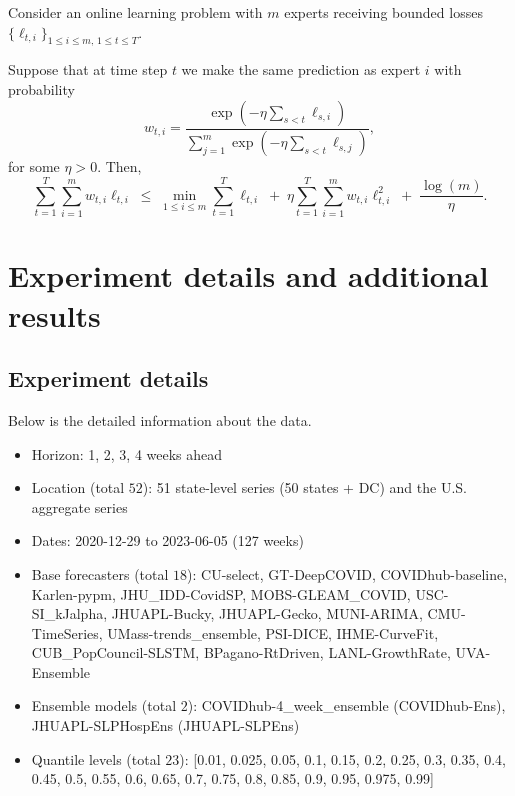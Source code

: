 \begin{theorem} \label{appthm:hedge_regret}
  Consider an online learning problem with $m$ experts receiving bounded losses 
  $\{\ell_{t,i}\}_{1 \le i \le m,\, 1 \le t \le T}$.
  
  Suppose that at time step $t$ we make the same prediction as expert $i$ with probability
  \[
  w_{t,i} = \frac{\exp\!\left(-\eta \sum_{s < t} \ell_{s,i}\right)}
  {\sum_{j=1}^m \exp\!\left(-\eta \sum_{s < t} \ell_{s,j}\right)},
  \]
  for some $\eta > 0$. Then,
  \[
  \sum_{t=1}^T \sum_{i=1}^m w_{t,i}\ell_{t,i}
  \;\le\;
  \min_{1 \le i \le m} \sum_{t=1}^T \ell_{t,i}
  \;+\; \eta \sum_{t=1}^T \sum_{i=1}^mw_{t,i}\ell_{t,i}^2
  \;+\; \frac{\log(m)}{\eta}.
  \]
  \end{theorem}



\section{Experiment details and additional results}
\subsection{Experiment details} \label{appsubsec:experiment_details}
Below is the detailed information about the data. 
\begin{itemize}
  \item Horizon: 1, 2, 3, 4 weeks ahead
  \item Location (total $52$): 51 state-level series (50 states + DC) and the U.S. aggregate series 
  \item Dates: 2020-12-29 to 2023-06-05 (127 weeks)
  \item Base forecasters (total $18$): CU-select, GT-DeepCOVID, COVIDhub-baseline, Karlen-pypm, JHU\_IDD-CovidSP, MOBS-GLEAM\_COVID, USC-SI\_kJalpha, JHUAPL-Bucky, JHUAPL-Gecko, MUNI-ARIMA, CMU-TimeSeries, UMass-trends\_ensemble, PSI-DICE, IHME-CurveFit, CUB\_PopCouncil-SLSTM, BPagano-RtDriven, LANL-GrowthRate, UVA-Ensemble
  \item Ensemble models (total $2$): COVIDhub-4\_week\_ensemble (COVIDhub-Ens), JHUAPL-SLPHospEns (JHUAPL-SLPEns)
  \item Quantile levels (total $23$): [0.01, 0.025, 0.05, 0.1, 0.15, 0.2, 0.25, 0.3, 0.35, 0.4, 0.45, 0.5, 0.55, 0.6, 0.65, 0.7, 0.75, 0.8, 0.85, 0.9, 0.95, 0.975, 0.99] 
\end{itemize}

